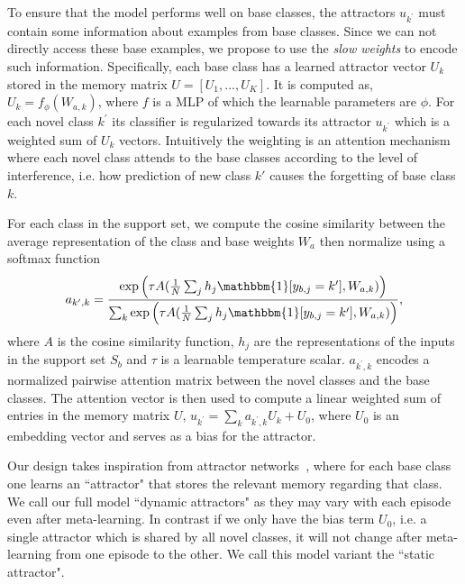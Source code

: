 To ensure that the model performs well on base classes, the attractors $u_{k^{\prime}}$ must contain
some information about examples from base classes. Since we can not directly access these base
examples, we propose to use the \textit{slow weights} to encode such information. Specifically, each
base class has a learned attractor vector $U_k$ stored in the memory matrix $U=[U_1,...,U_K]$. It is
computed as, $U_k = f_{\phi}(W_{a, k})$, where $f$ is a MLP of which the learnable parameters are
$\phi$. For each novel class $k^{\prime}$ its classifier is regularized towards its attractor
$u_{k^{\prime}}$ which is a weighted sum of $U_k$ vectors. Intuitively the weighting is an attention
mechanism where each novel class attends to the base classes according to the level of interference,
i.e. how prediction of new class $k'$ causes the forgetting of base class $k$.

For each class in the support set, we compute the cosine similarity between the average
representation of the class and  base weights $W_a$ then normalize using a softmax function
\begin{align}
a_{k^{\prime}, k} = 
\frac{\exp \left(\tau A(\frac{1}{N}\sum_{j} h_j \mathbbm{1}[y_{b,j} = 
k^{\prime}], W_{a, k}) \right)}
{\sum_{k} \exp \left(\tau A(\frac{1}{N}\sum_{j} h_j \mathbbm{1}[y_{b,j} = 
k^{\prime}], W_{a, k}) \right)},
\end{align}
where $A$ is the cosine similarity function, $h_j$ are the representations of the inputs in the
support set $S_b$ and $\tau$ is a learnable temperature scalar. $a_{k^{\prime},k}$ encodes a
normalized pairwise attention matrix between the novel classes and the base classes. The attention
vector is then used to compute a linear weighted sum of entries in the memory matrix $U$,
$u_{k^{\prime}} = \sum_k a_{k^{\prime}, k} U_k + U_0$, where $U_0$ is an embedding vector and serves
as a bias for the attractor.



Our design takes inspiration from attractor networks~\citep{attractor,localist}, where for each base
class one learns an ``attractor" that stores the relevant memory regarding that class. We call our
full model  ``dynamic attractors" as they may vary with each episode even after meta-learning. In
contrast if we only have the bias term $U_0$, i.e. a single attractor which is shared by all novel
classes, it will not change after meta-learning from one episode to the other. We call this model
variant the ``static attractor".

